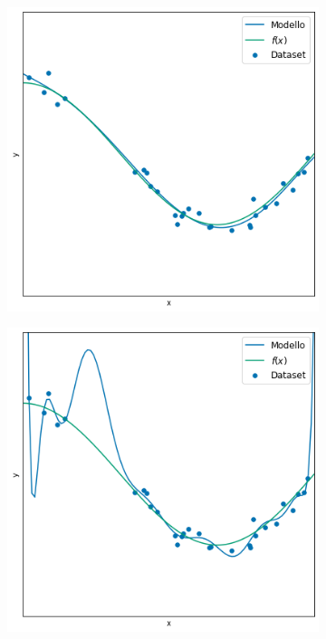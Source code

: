 \documentclass[../../main.tex]{subfiles}
\begin{document}
\begin{figure}[H]
\begin{subfigure}[t]{0.30\textwidth}
        \includegraphics[width=\textwidth]{immagini/4_2/4_2_3/good.png}
        \caption{}
        \label{fig:goodfitting}
    \end{subfigure}
    \begin{subfigure}[t]{0.30\textwidth}
        \centering
        \includegraphics[width=\textwidth]{immagini/4_2/4_2_3/over.png}

\end{subfigure}
\end{figure}
\end{document}
